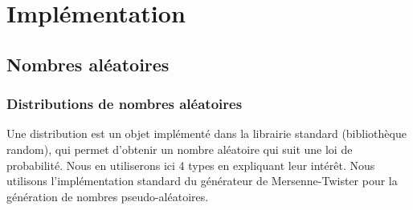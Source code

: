 \documentclass[11)pt,a4paper]{article}
\begin{document}
\section{Implémentation}
    \subsection{Nombres aléatoires}
        \subsubsection{Distributions de nombres aléatoires}
        Une distribution est un objet implémenté dans la librairie standard (bibliothèque random), qui permet d'obtenir un nombre aléatoire qui suit une loi de probabilité.
        Nous en utiliserons ici 4 types en expliquant leur intérêt.
        Nous utilisons l'implémentation standard du générateur de Mersenne-Twister pour la génération de nombres pseudo-aléatoires.
        \begin{mdframed}[backgroundcolor=light-gray, roundcorner=20pt, innerleftmargin=20, innertopmargin=1, innerbottommargin=1, outerlinewidth=1, linecolor=darkgray]
            
        \end{mdframed}
\end{document}
